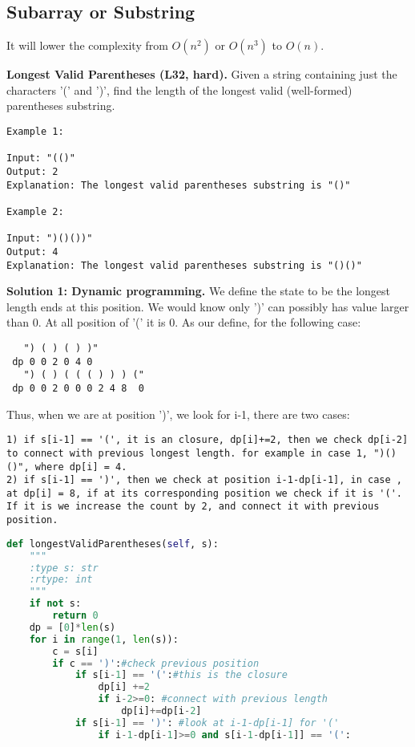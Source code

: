 \documentclass[../main.tex]{subfiles}
\begin{document}
\subsection{Subarray or Substring}
It will lower the complexity from $O(n^2)$ or $O(n^3)$ to $O(n)$.
\begin{examples}[resume]
\item \textbf{Longest Valid Parentheses (L32, hard).} Given a string containing just the characters '(' and ')', find the length of the longest valid (well-formed) parentheses substring.
\begin{lstlisting}[numbers=none]
Example 1:

Input: "(()"
Output: 2
Explanation: The longest valid parentheses substring is "()"

Example 2:

Input: ")()())"
Output: 4
Explanation: The longest valid parentheses substring is "()()"
\end{lstlisting}
\textbf{Solution 1: Dynamic programming.} We define the state to be the longest length ends at this position. We would know only ')' can possibly has value larger than 0. At all position of '(' it is 0. As our define, for the following case:
\begin{lstlisting}
   ") ( ) ( ) )"
 dp 0 0 2 0 4 0
   ") ( ) ( ( ( ) ) ) ("
 dp 0 0 2 0 0 0 2 4 8  0
\end{lstlisting}
Thus, when we are at position ')', we look for i-1, there are two cases:
\begin{lstlisting}
1) if s[i-1] == '(', it is an closure, dp[i]+=2, then we check dp[i-2] to connect with previous longest length. for example in case 1, ")()()", where dp[i] = 4.
2) if s[i-1] == ')', then we check at position i-1-dp[i-1], in case , at dp[i] = 8, if at its corresponding position we check if it is '('. If it is we increase the count by 2, and connect it with previous position.  
\end{lstlisting}
\begin{lstlisting}[language=Python]
def longestValidParentheses(self, s):
    """
    :type s: str
    :rtype: int
    """
    if not s:
        return 0
    dp = [0]*len(s)
    for i in range(1, len(s)):
        c = s[i]
        if c == ')':#check previous position
            if s[i-1] == '(':#this is the closure
                dp[i] +=2
                if i-2>=0: #connect with previous length
                    dp[i]+=dp[i-2]
            if s[i-1] == ')': #look at i-1-dp[i-1] for '('
                if i-1-dp[i-1]>=0 and s[i-1-dp[i-1]] == '(':

\end{lstlisting}
\end{examples}
\end{document}
